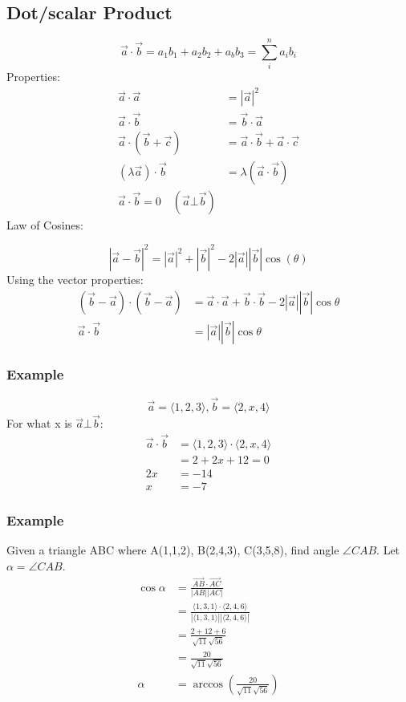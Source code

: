 \documentclass[letterpaper, 12pt]{math}
\begin{document}
\subsection*{Dot/scalar Product}
\[ \vec{a}\cdot\vec{b} = a_{1}b_{1}+a_{2}b_{2}+a_{b}b_{3} =
   \sum_{i}^{n}a_{i}b_{i} \]
Properties:
\begin{align*}
  \vec{a}\cdot\vec{a} &= |\vec{a}|^{2} \\
  \vec{a}\cdot\vec{b} &= \vec{b}\cdot\vec{a} \\
  \vec{a}\cdot(\vec{b}+\vec{c}) &= \vec{a}\cdot\vec{b}+\vec{a}\cdot\vec{c} \\
  (\lambda\vec{a})\cdot\vec{b} &= \lambda(\vec{a}\cdot\vec{b}) \\
  \vec{a}\cdot\vec{b} = 0 \quad (\vec{a}\bot\vec{b})
\end{align*}
Law of Cosines:
\begin{center}
\end{center}
\[ |\vec{a}-\vec{b}|^{2} = |\vec{a}|^{2}+|\vec{b}|^{2}-
  2|\vec{a}||\vec{b}|\cos(\theta) \]
Using the vector properties:
\begin{align*}
  (\vec{b}-\vec{a})\cdot(\vec{b}-\vec{a}) &=
    \vec{a}\cdot\vec{a}+\vec{b}\cdot\vec{b}-2|\vec{a}||\vec{b}|\cos\theta \\
  \vec{a}\cdot\vec{b} &= |\vec{a}||\vec{b}|\cos\theta
\end{align*}

\subsubsection*{Example}
\[ \vec{a} = \langle1,2,3\rangle, \vec{b} = \langle2,x,4\rangle \]
For what x is \( \vec{a}\bot\vec{b} \):
\begin{align*}
  \vec{a}\cdot\vec{b} &= \langle1,2,3\rangle\cdot\langle2,x,4\rangle \\
  &= 2+2x+12 = 0 \\
  2x &= -14 \\
  x &= -7
\end{align*}

\subsubsection*{Example}
Given a triangle ABC where A(1,1,2), B(2,4,3), C(3,5,8), find angle
\( \angle CAB \). Let \( \alpha = \angle CAB \).
\begin{align*}
  \cos\alpha &= \frac{\vec{AB}\cdot\vec{AC}}{|AB||AC|} \\
  &= \frac{\langle1,3,1\rangle\cdot\langle2,4,6\rangle}
    {|\langle1,3,1\rangle||\langle2,4,6\rangle|} \\
  &= \frac{2+12+6}{\sqrt{11}\sqrt{56}} \\
  &= \frac{20}{\sqrt{11}\sqrt{56}} \\
  \alpha &= \arccos(\frac{20}{\sqrt{11}\sqrt{56}})
\end{align*}
\end{document}
